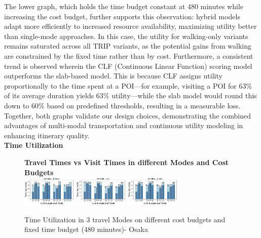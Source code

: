 The lower graph, which holds the time budget constant at 480 minutes while increasing the cost budget, further supports this observation: hybrid models adapt more efficiently to increased resource availability, maximizing utility better than single-mode approaches. In this case, the utility for walking-only variants remains saturated across all TRIP variants, as the potential gains from walking are constrained by the fixed time rather than by cost. Furthermore, a consistent trend is observed wherein the CLF (Continuous Linear Function) scoring model outperforms the slab-based model. This is because CLF assigns utility proportionally to the time spent at a POI—for example, visiting a POI for 63\% of its average duration yields 63\% utility—while the slab model would round this down to 60\% based on predefined thresholds, resulting in a measurable loss. Together, both graphs validate our design choices, demonstrating the combined advantages of multi-modal transportation and continuous utility modeling in enhancing itinerary quality.\\

\noindent\textbf{Time Utilization}
\begin{figure}[H]
\textbf{Travel Times vs Visit Times in different Modes and Cost Budgets}\\
\includegraphics[width=0.23\textwidth]{plots/TIME_UTILIZATION_BINARY.png}
\includegraphics[width=0.23\textwidth]{plots/TIME_UTILIZATION_CLF.png}
\includegraphics[width=0.23\textwidth]{plots/TIME_UTILIZATION_SLABS.png}
\hspace{8pt}
\caption{Time Utilization in 3 travel Modes on different cost budgets and fixed time budget (480 minutes)- Osaka}
\label{fig:TimeUtilization}
\end{figure}

